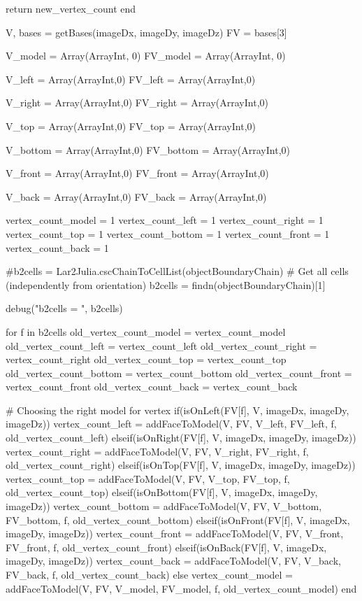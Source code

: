 \documentclass[11pt,oneside]{article}	%
\begin{document}
{    return new_vertex_count
  end

  V, bases = getBases(imageDx, imageDy, imageDz)
  FV = bases[3]

  V_model = Array(Array{Int}, 0)
  FV_model = Array(Array{Int}, 0)

  V_left = Array(Array{Int},0)
  FV_left = Array(Array{Int},0)

  V_right = Array(Array{Int},0)
  FV_right = Array(Array{Int},0)

  V_top = Array(Array{Int},0)
  FV_top = Array(Array{Int},0)

  V_bottom = Array(Array{Int},0)
  FV_bottom = Array(Array{Int},0)

  V_front = Array(Array{Int},0)
  FV_front = Array(Array{Int},0)

  V_back = Array(Array{Int},0)
  FV_back = Array(Array{Int},0)

  vertex_count_model = 1
  vertex_count_left = 1
  vertex_count_right = 1
  vertex_count_top = 1
  vertex_count_bottom = 1
  vertex_count_front = 1
  vertex_count_back = 1

  #b2cells = Lar2Julia.cscChainToCellList(objectBoundaryChain)
  # Get all cells (independently from orientation)
  b2cells = findn(objectBoundaryChain)[1]

  debug("b2cells = ", b2cells)

  for f in b2cells
    old_vertex_count_model = vertex_count_model
    old_vertex_count_left = vertex_count_left
    old_vertex_count_right = vertex_count_right
    old_vertex_count_top = vertex_count_top
    old_vertex_count_bottom = vertex_count_bottom
    old_vertex_count_front = vertex_count_front
    old_vertex_count_back = vertex_count_back

    # Choosing the right model for vertex
    if(isOnLeft(FV[f], V, imageDx, imageDy, imageDz))
      vertex_count_left = addFaceToModel(V, FV, V_left, FV_left, f, old_vertex_count_left)
    elseif(isOnRight(FV[f], V, imageDx, imageDy, imageDz))
      vertex_count_right = addFaceToModel(V, FV, V_right, FV_right, f, old_vertex_count_right)
    elseif(isOnTop(FV[f], V, imageDx, imageDy, imageDz))
      vertex_count_top = addFaceToModel(V, FV, V_top, FV_top, f, old_vertex_count_top)
    elseif(isOnBottom(FV[f], V, imageDx, imageDy, imageDz))
      vertex_count_bottom = addFaceToModel(V, FV, V_bottom, FV_bottom, f, old_vertex_count_bottom)
    elseif(isOnFront(FV[f], V, imageDx, imageDy, imageDz))
      vertex_count_front = addFaceToModel(V, FV, V_front, FV_front, f, old_vertex_count_front)
    elseif(isOnBack(FV[f], V, imageDx, imageDy, imageDz))
      vertex_count_back = addFaceToModel(V, FV, V_back, FV_back, f, old_vertex_count_back)
    else
      vertex_count_model = addFaceToModel(V, FV, V_model, FV_model, f, old_vertex_count_model)
    end

}
\end{document}
